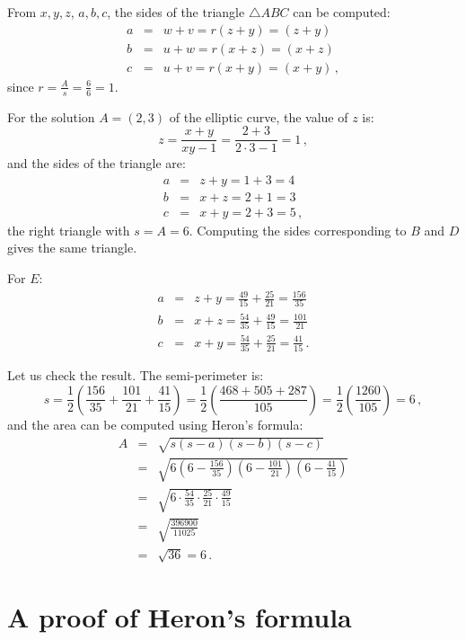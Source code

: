 From $x,y,z$, $a,b,c$, the sides of the triangle $\triangle ABC$ can be computed:
\begin{eqnarray*}
a&=&w+v = r(z+y)=(z+y)\\
b&=&u+w= r(x+z)=(x+z)\\
c&=&u+v=r(x+y)=(x+y)\,,
\end{eqnarray*}
since $\displaystyle r=\frac{A}{s}=\frac{6}{6}=1$.

For the solution $A=(2,3)$ of the elliptic curve, the value of $z$ is:
\[
z=\frac{x+y}{xy-1}=\frac{2+3}{2\cdot 3-1}=1\,,
\]
and the sides of the triangle are:
\begin{eqnarray*}
a &=& z+y = 1+3 = 4\\
b &=& x+z = 2+1=3\\
c &=& x+y = 2+3=5\,,
\end{eqnarray*}
the right triangle with $s=A=6$. Computing the sides corresponding to $B$ and $D$ gives the same triangle.

For $E$:
\begin{eqnarray*}
a &=& z+y = \frac{49}{15} + \frac{25}{21} = \frac{156}{35}\\
b &=& x+z = \frac{54}{35} + \frac{49}{15} = \frac{101}{21}\\
c &=& x+y = \frac{54}{35} + \frac{25}{21}  = \frac{41}{15}\,.
\end{eqnarray*}

Let us check the result. The semi-perimeter is:
\[
s=\frac{1}{2}\left(\frac{156}{35} + \frac{101}{21}+\frac{41}{15}\right) = \frac{1}{2}\left(\frac{468+505+287}{105}\right) = \frac{1}{2}\left(\frac{1260}{105}\right)= 6\,,
\]
and the area can be computed using Heron's formula:
\begin{eqnarray*}
A &=& \sqrt{s(s-a)(s-b)(s-c)}\\
&=& \sqrt{6 \left(6-\frac{156}{35}\right) \left(6-\frac{101}{21}\right) \left(6-\frac{41}{15}\right)}\\
&=& \sqrt{6 \cdot \frac{54}{35}\cdot \frac{25}{21} \cdot \frac{49}{15}}\\
&=& \sqrt{\frac{396900}{11025}}\\
&=& \sqrt{36} = 6\,.
\end{eqnarray*}

\section{A proof of Heron's formula}

